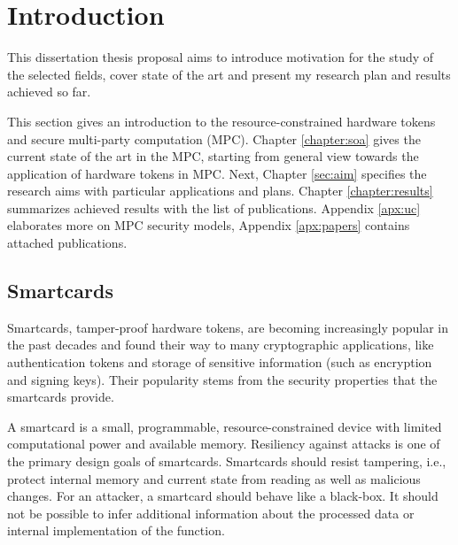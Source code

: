 \documentclass[
  digital, %
  twoside, %
  table,   %
  lof,     %
  lot,     %
]{fithesis3}
\newcounter{ph4_show_guides}
\theoremstyle{definition}
\theoremstyle{remark}
\begin{document}
\setlength{\marginparwidth}{2.5cm}   %
\setcounter{biburlnumpenalty}{5000}  %


\chapter{Introduction}\label{sec:intro}

This dissertation thesis proposal aims to introduce motivation for the study of the selected fields, cover state of the art and present my research plan and results achieved so far.

This section gives an introduction to the resource-constrained hardware tokens and secure multi-party computation (MPC). Chapter \ref{chapter:soa} gives the current state of the art in the MPC, starting from general view towards the application of hardware tokens in MPC. Next, Chapter \ref{sec:aim} specifies the research aims with particular applications and plans. Chapter \ref{chapter:results} summarizes achieved results with the list of publications. Appendix \ref{apx:uc} elaborates more on MPC security models, Appendix \ref{apx:papers} contains attached publications.

\section{Smartcards}
Smartcards, tamper-proof hardware tokens, are becoming increasingly popular in the past decades and found their way to many cryptographic applications, like authentication tokens and storage of sensitive information (such as encryption and signing keys). Their popularity stems from the security properties that the smartcards provide. 

A smartcard is a small, programmable, resource-constrained device with limited computational power and available memory. Resiliency against attacks is one of the primary design goals of smartcards.
Smartcards should resist tampering, i.e., protect internal memory and current state from reading as well as malicious changes. For an attacker, a smartcard should behave like a black-box. It should not be possible to infer additional information about the processed data or internal implementation of the function.
\end{document}
